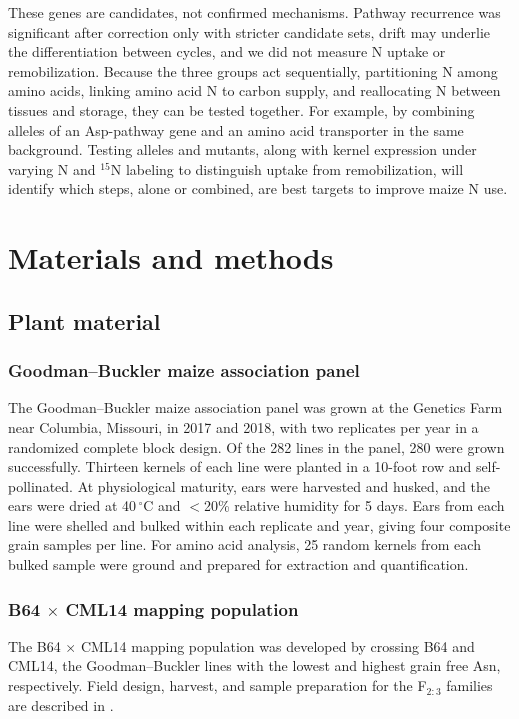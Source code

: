 \documentclass[namedate,unnumsec,webpdf,contemporary,large]{oup-authoring-template}
\begin{document}
These genes are candidates, not confirmed mechanisms. Pathway recurrence was significant after correction only with stricter candidate sets, drift may underlie the differentiation between cycles, and we did not measure N uptake or remobilization. Because the three groups act sequentially, partitioning N among amino acids, linking amino acid N to carbon supply, and reallocating N between tissues and storage, they can be tested together. For example, by combining alleles of an Asp-pathway gene and an amino acid transporter in the same background. Testing alleles and mutants, along with kernel expression under varying N and $^{15}$N labeling to distinguish uptake from remobilization, will identify which steps, alone or combined, are best targets to improve maize N use.

\section{Materials and methods}

\subsection{Plant material}

\subsubsection{Goodman--Buckler maize association panel}
The Goodman--Buckler maize association panel \citep{FlintGarcia2005Goodman} was grown at the Genetics Farm near Columbia, Missouri, in 2017 and 2018, with two replicates per year in a randomized complete block design. Of the 282 lines in the panel, 280 were grown successfully. Thirteen kernels of each line were planted in a 10-foot row and self-pollinated. At physiological maturity, ears were harvested and husked, and the ears were dried at 40\,$^{\circ}$C and $<$20\% relative humidity for 5 days. Ears from each line were shelled and bulked within each replicate and year, giving four composite grain samples per line. For amino acid analysis, 25 random kernels from each bulked sample were ground and prepared for extraction and quantification.

\subsubsection{B64 $\times$ CML14 mapping population}
The B64 $\times$ CML14 mapping population was developed by crossing B64 and CML14, the Goodman--Buckler lines with the lowest and highest grain free Asn, respectively. Field design, harvest, and sample preparation for the F$_{2:3}$ families are described in \citet{Fitzsimmons2026KernelKitchen}.
\end{document}
